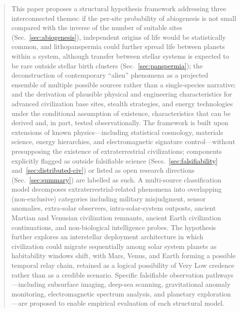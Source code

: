 \documentclass[aps,prd,twocolumn,superscriptaddress,nofootinbib]{revtex4-2}
\begin{document}
\date{March 12, 2026}

\begin{abstract}
This paper proposes a structural hypothesis framework addressing three interconnected themes: if the per-site probability of abiogenesis is not small compared with the inverse of the number of suitable sites (Sec.~\ref{sec:abiogenesis}), independent origins of life would be statistically common, and lithopanspermia could further spread life between planets within a system, although transfer between stellar systems is expected to be rare outside stellar birth clusters (Sec.~\ref{sec:panspermia}); the deconstruction of contemporary ``alien'' phenomena as a projected ensemble of multiple possible sources rather than a single-species narrative; and the derivation of plausible physical and engineering characteristics for advanced civilization base sites, stealth strategies, and energy technologies under the conditional assumption of existence, characteristics that can be derived and, in part, tested observationally. The framework is built upon extensions of known physics---including statistical cosmology, materials science, energy hierarchies, and electromagnetic signature control---without presupposing the existence of extraterrestrial civilizations; components explicitly flagged as outside falsifiable science (Secs.~\ref{sec:falsifiability} and~\ref{sec:distributed-civ}) or listed as open research directions (Sec.~\ref{sec:summary}) are labelled as such. A multi-source classification model decomposes extraterrestrial-related phenomena into overlapping (non-exclusive) categories including military misjudgment, sensor anomalies, extra-solar observers, intra-solar-system outposts, ancient Martian and Venusian civilization remnants, ancient Earth civilization continuations, and non-biological intelligence probes. The hypothesis further explores an interstellar deployment architecture in which civilization could migrate sequentially among solar system planets as habitability windows shift, with Mars, Venus, and Earth forming a possible temporal relay chain, retained as a logical possibility of Very Low credence rather than as a credible scenario. Specific falsifiable observation pathways---including subsurface imaging, deep-sea scanning, gravitational anomaly monitoring, electromagnetic spectrum analysis, and planetary exploration---are proposed to enable empirical evaluation of each structural model.
\end{abstract}

\maketitle
\end{document}
